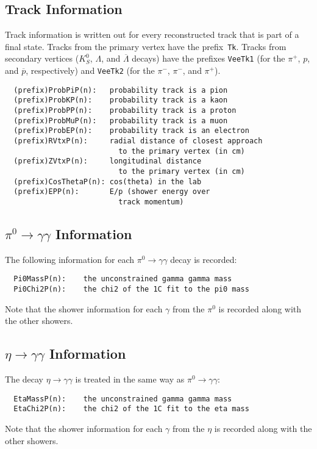 \documentclass[11pt]{article}
\begin{document}
\subsection{Track Information}

Track information is written out for every reconstructed track that is part of a final state.  Tracks from the primary vertex have the prefix~{\tt Tk}.  Tracks from secondary vertices ($K^0_S$, $\Lambda$, and $\overline{\Lambda}$ decays) have the prefixes {\tt VeeTk1} (for the $\pi^+$, $p$, and $\overline{p}$, respectively) and {\tt VeeTk2} (for the $\pi^-$, $\pi^-$, and $\pi^+$).


\begin{verbatim}
  (prefix)ProbPiP(n):   probability track is a pion
  (prefix)ProbKP(n):    probability track is a kaon
  (prefix)ProbPP(n):    probability track is a proton
  (prefix)ProbMuP(n):   probability track is a muon
  (prefix)ProbEP(n):    probability track is an electron
  (prefix)RVtxP(n):     radial distance of closest approach
                          to the primary vertex (in cm)
  (prefix)ZVtxP(n):     longitudinal distance
                          to the primary vertex (in cm)
  (prefix)CosThetaP(n): cos(theta) in the lab
  (prefix)EPP(n):       E/p (shower energy over
                          track momentum)
\end{verbatim}

\subsection[$\pi^0\to\gamma\gamma$ Information]{\boldmath $\pi^0\to\gamma\gamma$ Information}

The following information for each $\pi^0\to\gamma\gamma$ decay is recorded:
\begin{verbatim}
  Pi0MassP(n):    the unconstrained gamma gamma mass
  Pi0Chi2P(n):    the chi2 of the 1C fit to the pi0 mass
\end{verbatim}
Note that the shower information for each $\gamma$ from the $\pi^0$ is recorded along with the other showers.

\subsection[$\eta\to\gamma\gamma$ Information]{\boldmath $\eta\to\gamma\gamma$ Information}

The decay $\eta\to\gamma\gamma$ is treated in the same way as $\pi^0\to\gamma\gamma$:
\begin{verbatim}
  EtaMassP(n):    the unconstrained gamma gamma mass
  EtaChi2P(n):    the chi2 of the 1C fit to the eta mass
\end{verbatim}
Note that the shower information for each $\gamma$ from the $\eta$ is recorded along with the other showers.
\end{document}
